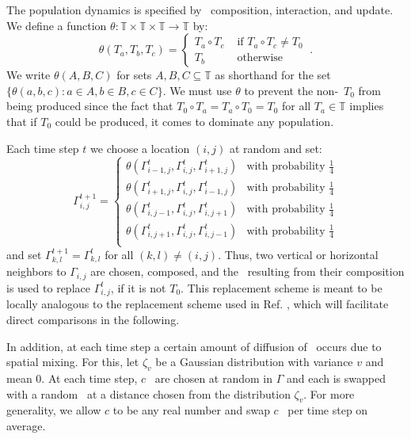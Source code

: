 \documentclass[pre,twocolumn,showpacs,superscriptaddress,preprintnumbers,floatfix]{revtex4}
\theoremstyle{plain}    \newtheorem{Lem}{Lemma}
\theoremstyle{plain}    \newtheorem*{ProLem}{Proof}
\theoremstyle{plain}    \newtheorem{Cor}{Corollary}
\theoremstyle{plain}    \newtheorem*{ProCor}{Proof}
\theoremstyle{plain}    \newtheorem{The}{Theorem}
\theoremstyle{plain}    \newtheorem*{ProThe}{Proof}
\theoremstyle{plain}    \newtheorem{Prop}{Proposition}
\theoremstyle{plain}    \newtheorem*{ProProp}{Proof}
\theoremstyle{plain}    \newtheorem*{Conj}{Conjecture}
\theoremstyle{plain}    \newtheorem*{Rem}{Remark}
\theoremstyle{plain}    \newtheorem{Def}{Definition}
\theoremstyle{plain}    \newtheorem*{Not}{Notation}
\newcommand{\T}{\mathbb{T}}
\begin{document}
The population dynamics is specified by \eM\ composition, interaction, and
update. We define a function $\theta: \T \times \T \times \T \to \T$ by:
\begin{equation}
\theta(T_{a}, T_{b}, T_{c}) =
  \begin{cases}
    T_{a} \circ T_{c} & \text{ if } T_{a} \circ T_{c} \neq T_{0} \\
    T_{b} & \text{ otherwise }
  \end{cases} ~.
\end{equation}
We write $\theta(A, B, C)$ for sets $A,B,C \subseteq \T$ as shorthand for the
set $\lbrace \theta(a,b,c) : a \in A, b \in B, c \in C \rbrace$. We must use
$\theta$ to prevent the non-\eM\ $T_0$ from being produced since the fact
that $T_0 \circ T_a = T_a \circ T_0 = T_0$ for all $T_a\in \T$ implies that
if $T_0$ could be produced, it comes to dominate any population. 

Each time step $t$ we choose a location $(i,j)$ at random and set:
\begin{equation}
\Gamma_{i,j}^{t+1} =
  \begin{cases}
    \theta \left( \Gamma_{i-1,j}^{t}, \Gamma_{i,j}^t, \Gamma_{i+1,j}^{t} \right)
	& \!\!  \text{with probability } \tfrac{1}{4}\\
    \theta \left( \Gamma_{i+1,j}^{t}, \Gamma_{i,j}^t, \Gamma_{i-1,j}^{t} \right)
	& \!\!  \text{with probability } \tfrac{1}{4}\\
    \theta \left( \Gamma_{i,j-1}^{t}, \Gamma_{i,j}^t, \Gamma_{i,j+1}^{t} \right)
	& \!\!  \text{with probability } \tfrac{1}{4}\\
    \theta \left( \Gamma_{i,j+1}^{t}, \Gamma_{i,j}^t, \Gamma_{i,j-1}^{t} \right)
	& \!\!  \text{with probability } \tfrac{1}{4}\\
  \end{cases}
\label{eq:localupdate}
\end{equation}
and set $\Gamma_{k,l}^{t+1}=\Gamma_{k,l}^t$ for all $(k,l) \neq (i,j)$. Thus,
two vertical or horizontal neighbors to $\Gamma_{i,j}$ are chosen, composed,
and the \eM\ resulting from their composition is used to replace
$\Gamma_{i,j}^t$, if it is not $T_0$. This replacement scheme is meant to be
locally analogous to the replacement scheme used in Ref. \cite{OTMOMerge},
which will facilitate direct comparisons in the following.

In addition, at each time step a certain amount of diffusion of \eMs\ occurs
due to spatial mixing. For this, let $\zeta_v$ be a Gaussian distribution with
variance $v$ and mean $0$. At each time step, $c$ \eMs\ are chosen at random
in $\Gamma$ and each is swapped with a random \eM\ at a distance chosen from
the distribution $\zeta_v$. For more generality, we allow $c$ to be any real
number and swap $c$ \eMs\ per time step on average. 
\end{document}
